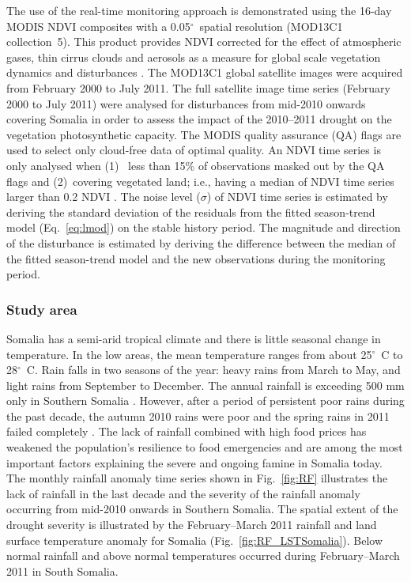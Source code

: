 \documentclass[authoryear,preprint,review,10pt]{elsarticle}
\newcommand{\degree}{\ensuremath{^\circ}}
\begin{document}
The use of the real-time monitoring approach is demonstrated using the 16-day MODIS NDVI composites with a 0.05\degree \ spatial resolution (MOD13C1 collection~5). This product provides  NDVI corrected for the effect of atmospheric gases, thin cirrus clouds and aerosols as a measure for global scale vegetation dynamics and disturbances \citep{Huete2002}. The MOD13C1 global satellite images were acquired from February 2000 to July 2011. The full satellite image time series  (February 2000 to July 2011) were analysed for disturbances from mid-2010 onwards covering Somalia in order to assess the impact of the 2010--2011 drought on the vegetation photosynthetic capacity. The MODIS quality assurance (QA) flags are used to select only cloud-free data of optimal quality. An NDVI time series is only analysed when (1)~ less than 15\% of observations masked out by the QA flags and (2)~covering vegetated land; i.e., having a median of NDVI time series larger than 0.2 NDVI \citep{Beurs2009, deJong:wo, Vrieling:2011da}. The noise level ($\sigma$) of NDVI time series is estimated by deriving the standard deviation of the residuals from the fitted season-trend model (Eq.~\ref{eq:lmod}) on the stable history period.  The magnitude and direction of the disturbance is estimated by deriving the difference between the median of the fitted season-trend model and the new observations during the monitoring period.

\subsubsection*{Study area}

Somalia has a semi-arid tropical climate and there is little seasonal change in temperature. In the low areas, the mean temperature ranges from about 25\degree~C to 28\degree~C.  Rain falls in two seasons of the year: heavy rains from March to May, and light rains from September to December. The annual rainfall is exceeding 500 mm only in Southern Somalia \citep{Muchiri2007}. However, after a period of persistent poor rains during the past decade, the autumn 2010 rains were poor and the spring rains in 2011 failed completely \citep{Funk:2011fg}. The lack of rainfall combined with high food prices has weakened the population's resilience to food emergencies and are among the most important factors explaining the severe and ongoing famine in Somalia today. The monthly rainfall anomaly time series shown in Fig.~\ref{fig:RF} illustrates the lack of rainfall in the last decade and the severity of the rainfall anomaly occurring from mid-2010 onwards in Southern Somalia. The spatial extent of the drought severity is illustrated by the February--March 2011 rainfall \citep{Xie:1997tw} and land surface temperature anomaly for Somalia (Fig.~\ref{fig:RF_LSTSomalia}). Below normal rainfall and above normal temperatures occurred during February--March 2011 in South Somalia.
\end{document}
